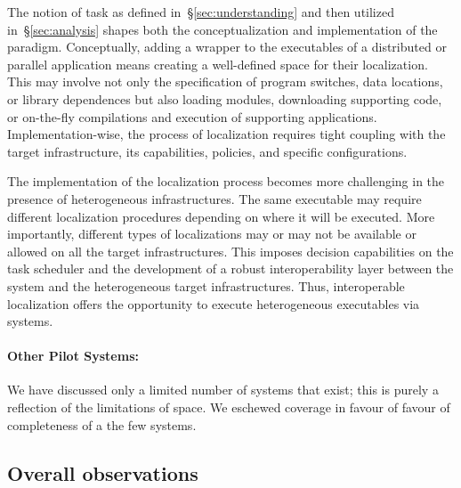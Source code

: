 \documentclass{sig-alternate}
\begin{document}
 

The notion of task as defined in~\S\ref{sec:understanding} and then utilized
in~\S\ref{sec:analysis} shapes both the conceptualization and implementation of
the \pilot paradigm. Conceptually, adding a wrapper to the executables of a
distributed or parallel application means creating a well-defined space for
their localization. This may involve not only the specification of program
switches, data locations, or library dependences but also loading modules,
downloading supporting code, or on-the-fly compilations and execution of
supporting applications. Implementation-wise, the process of localization
requires tight coupling with the target infrastructure, its capabilities,
policies, and specific configurations.

The implementation of the localization process becomes more challenging in the
presence of heterogeneous infrastructures. The same executable may require
different localization procedures depending on where it will be executed. More
importantly, different types of localizations may or may not be available or
allowed on all the target infrastructures. This imposes decision capabilities on
the task scheduler and the development of a robust interoperability layer
between the \pilot system and the heterogeneous target infrastructures.  Thus,
interoperable localization offers the opportunity to execute heterogeneous
executables via \pilot systems.


%

\paragraph{Other Pilot Systems:} We have discussed only a limited number of
\pilots systems that exist; this is purely a reflection of the limitations of
space. We eschewed coverage in favour of favour of completeness of a the few
\pilot systems. 

\subsection{Overall observations}
\end{document}
